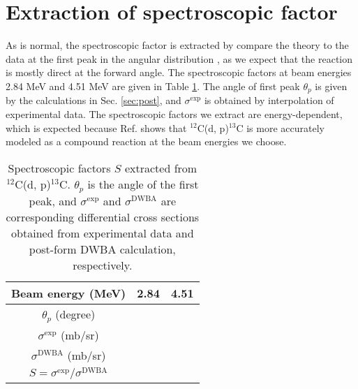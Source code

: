 \section{Extraction of spectroscopic factor}
As is normal, the spectroscopic factor is extracted by compare the theory to the data at the first peak in the angular distribution
\cite{PhysRevC.69.064313}, as we expect that the reaction is mostly direct at the forward angle. 
The spectroscopic factors at beam energies 2.84 MeV and 4.51 MeV are given in Table \ref{tab:spec}. 
The angle of first peak $\theta_{p}$ is given by the calculations in Sec. \ref{sec:post}, 
and $\sigma^{\mathrm{exp}}$ is obtained by interpolation of experimental data. 
The spectroscopic factors we extract are energy-dependent, 
which is expected because Ref. \cite{PhysRev.101.209} shows that $^{12}$C(d, p)$^{13}$C is more accurately modeled as a compound reaction at the beam energies we choose. 
\begin{table}[bt]
	\centering
	\caption{Spectroscopic factors $S$ extracted from $^{12}$C(d, p)$^{13}$C. 
	$\theta_p$ is the angle of the first peak, and $\sigma^{\mathrm{exp}}$ and $\sigma^{\mathrm{DWBA}}$ are corresponding differential cross sections obtained from experimental data and post-form DWBA calculation, respectively. }
	\label{tab:spec}
	\begin{tabular}{ccc}
		\hline
		\hline
		Beam energy (MeV)                                & 2.84 & 4.51 \\
		\hline
		$\theta_p$ (degree)                &  &  \\
		$\sigma^{\mathrm{exp}}$ (mb/sr)                          &  &  \\
		$\sigma^{\mathrm{DWBA}}$ (mb/sr)                        &  &  \\
		$S=\sigma^{\mathrm{exp}}/\sigma^{\mathrm{DWBA}}$ &  &  \\
		\hline
		\hline
	\end{tabular}
\end{table}